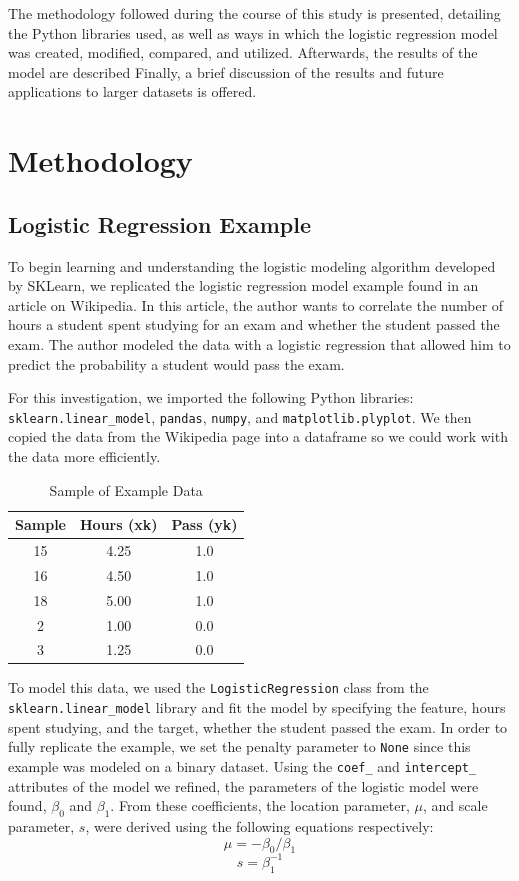 \documentclass[journal]{IEEEtran}
\begin{document}
The methodology followed during the course of this study is presented, detailing the Python libraries used,  as well as ways in which the logistic regression model was created, modified, compared, and utilized. Afterwards, the results of the model are described Finally, a brief discussion of the results and future applications to larger datasets is offered. 

\section{Methodology}

\subsection{Logistic Regression Example}
To begin learning and understanding the logistic modeling algorithm developed by SKLearn, we replicated the logistic regression model example found in an article on Wikipedia. In this article, the author wants to correlate the number of hours a student spent studying for an exam and whether the student passed the exam. The author modeled the data with a logistic regression that allowed him to predict the probability a student would pass the exam.

For this investigation, we imported the following Python libraries: \lstinline{sklearn.linear_model}, \lstinline{pandas}, \lstinline{numpy}, and \lstinline{matplotlib.plyplot}. We then copied the data from the Wikipedia page into a dataframe so we could work with the data more efficiently. 

\begin{table}[h!]
\centering
\begin{tabular}{c c c}
    Sample & Hours (xk) &	Pass (yk) \\
    \hline
    15	& 4.25	& 1.0 \\
    16	& 4.50	& 1.0 \\
    18	& 5.00	& 1.0 \\
    2	& 1.00	& 0.0 \\
    3	& 1.25	& 0.0
\end{tabular}    
\caption{Sample of Example Data}
\end{table}

To model this data, we used the \lstinline{LogisticRegression} class from the \lstinline{sklearn.linear_model} library and fit the model by specifying the feature, hours spent studying, and the target, whether the student passed the exam. In order to fully replicate the example, we set the penalty parameter to \lstinline{None} since this example was modeled on a binary dataset. Using the \lstinline{coef_} and \lstinline{intercept_} attributes of the model we refined, the parameters of the logistic model were found, $\beta_0$ and $\beta_1$. From these coefficients, the location parameter, $\mu$, and scale parameter, \(s\), were derived using the following equations respectively:
\[ \mu =  -\beta_0 / \beta_1\] 
\[ s = \beta_1^{-1} \]
\end{document}
